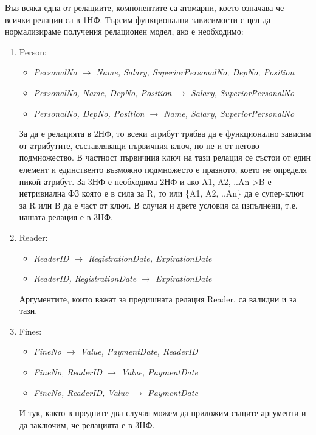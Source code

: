 \documentclass[11pt,a4paper]{article}
\begin{document}
\par Във всяка една от релациите, компонентите са атомарни, което означава че всички релации са в 1НФ. Търсим функционални зависимости с цел да нормализираме получения релационен модел, ако е необходимо: 
\begin{enumerate}
\item Person:
\begin{itemize}
\item \textit {PersonalNo $\rightarrow$ Name, Salary, SuperiorPersonalNo, DepNo, Position}
\item \textit {PersonalNo, Name, DepNo, Position $\rightarrow$ Salary, SuperiorPersonalNo}
\item \textit {PersonalNo, DepNo, Position $\rightarrow$ Name, Salary, SuperiorPersonalNo}
\end{itemize}
\par
За да е релацията в 2НФ, то всеки атрибут трябва да е функционално зависим от атрибутите, съставляващи първичния ключ, но не и от негово подмножество. В частност първичния ключ на тази релация се състои от един елемент и единственто възможно подмножесто е празното, което не определя никой атрибут. За 3НФ е необходима 2НФ и ако A1, A2, ..An->B е нетривиална ФЗ която е в сила за R, то или \{A1, A2, ..An\} да е супер-ключ за R или B да е част от ключ. В случая и двете условия са изпълнени, т.е. нашата релация е в 3НФ.

\item Reader:
\begin{itemize}
\item \textit{ReaderID $\rightarrow$ RegistrationDate, ExpirationDate}
\item \textit{ReaderID, RegistrationDate $\rightarrow$ ExpirationDate}
\end {itemize}
\par
Аргументите, които важат за предишната релация Reader, са валидни и за тази.

\item Fines:
\begin{itemize}
\item \textit{FineNo $\rightarrow$ Value, PaymentDate, ReaderID}
\item \textit{FineNo, ReaderID $\rightarrow$ Value, PaymentDate}
\item \textit{FineNo, ReaderID, Value $\rightarrow$ PaymentDate}
\end {itemize}
И тук, както в предните два случая можем да приложим същите аргументи и да заключим, че релацията е в 3НФ.


\end{enumerate}
\end{document}
